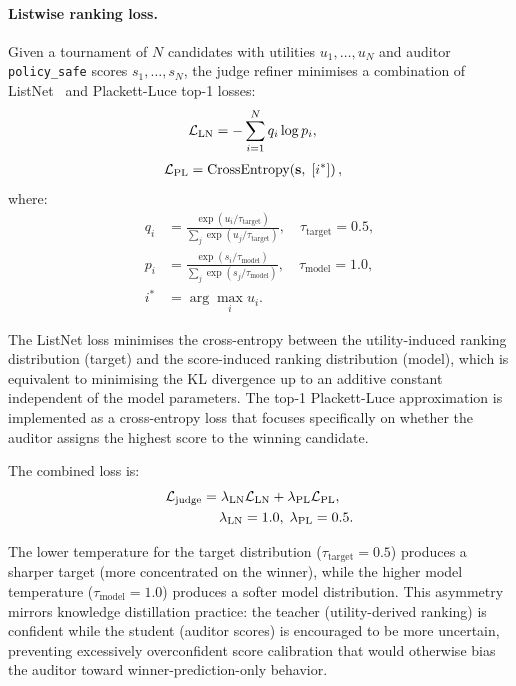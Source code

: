\paragraph{Listwise ranking loss.}
Given a tournament of $N$ candidates with utilities $u_1, \ldots, u_N$
and auditor \texttt{policy\_safe} scores $s_1, \ldots, s_N$, the judge
refiner minimises a combination of ListNet~\cite{cao2007listnet} and
Plackett-Luce top-1 losses:
\begin{align}
  \mathcal{L}_\text{LN} &= -\sum_{i=1}^N
    q_i \log p_i, 
    \notag
    \label{eq:listnet}
    \end{align}
\begin{align}
  \mathcal{L}_\text{PL} &= \text{CrossEntropy}\!\left(
    \mathbf{s},\; [i^*]\right),
    \notag
    \label{eq:pl_top1}
\end{align}
where:
\begin{align*}
  q_i &= \frac{\exp(u_i / \tau_\text{target})}{\sum_j \exp(u_j / \tau_\text{target})},
    \quad \tau_\text{target} = 0.5, \\
  p_i &= \frac{\exp(s_i / \tau_\text{model})}{\sum_j \exp(s_j / \tau_\text{model})},
    \quad \tau_\text{model} = 1.0, \\
  i^* &= \arg\max_i u_i. 
\end{align*}

The ListNet loss minimises the cross-entropy between the utility-induced
ranking distribution (target) and the score-induced ranking distribution
(model), which is equivalent to minimising the KL divergence up to an
additive constant independent of the model parameters.
The top-1 Plackett-Luce approximation is implemented as a cross-entropy
loss that focuses specifically on whether the auditor assigns the highest
score to the winning candidate.

The combined loss is:
\begin{equation}
\begin{aligned}
  \mathcal{L}_\text{judge} = \lambda_\text{LN} \mathcal{L}_\text{LN}
    + \lambda_\text{PL} \mathcal{L}_\text{PL},
  \quad
  \\
  \lambda_\text{LN} = 1.0, \;
  \lambda_\text{PL} = 0.5. \notag
  \end{aligned}
\end{equation}

The lower temperature for the target distribution ($\tau_\text{target} = 0.5$)
produces a sharper target (more concentrated on the winner), while the
higher model temperature ($\tau_\text{model} = 1.0$) produces a softer
model distribution.
This asymmetry mirrors knowledge distillation practice: the teacher
(utility-derived ranking) is confident while the student (auditor scores)
is encouraged to be more uncertain, preventing excessively overconfident score calibration that would otherwise bias the auditor toward winner-prediction-only behavior.

